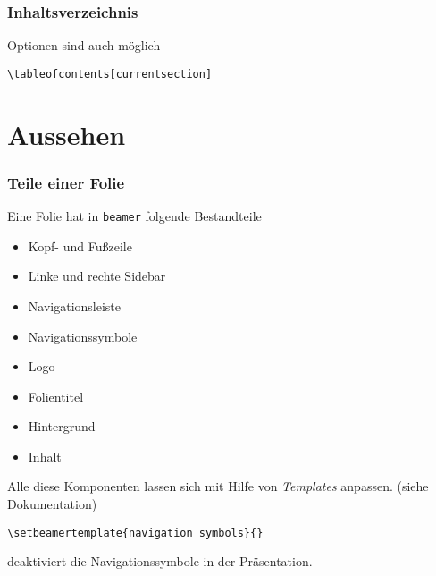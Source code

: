 \begin{slide}
  \frametitle{Inhaltsverzeichnis}


  Optionen sind auch möglich
\begin{lstlisting}
\tableofcontents[currentsection]
\end{lstlisting}


\end{slide}





\section{Aussehen}

\begin{slide}
  \frametitle{Teile einer Folie}

  \onslide<+->

  Eine Folie hat in \texttt{beamer} folgende Bestandteile
  \begin{itemize}
  \item Kopf- und Fußzeile
  \item Linke und rechte Sidebar
  \item Navigationsleiste
  \item Navigationssymbole
  \item Logo
  \item Folientitel
  \item Hintergrund
  \item Inhalt
  \end{itemize}

  \onslide<+->

  Alle diese Komponenten lassen sich mit Hilfe von \textit{Templates} anpassen. (siehe
  Dokumentation)
  \onslide<+->
  \begin{Beispiel}
\begin{lstlisting}
\setbeamertemplate{navigation symbols}{}
\end{lstlisting}
    deaktiviert die Navigationssymbole in der Präsentation.
  \end{Beispiel}

\end{slide}

